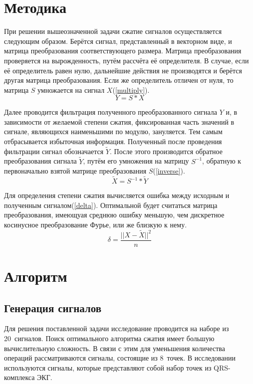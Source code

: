 \documentclass[11pt, oneside, a4paper]{article}
\begin{document}
\section{Методика}

При решении вышеозначенной задачи сжатие сигналов осуществляется следующим образом. Берётся сигнал, представленный в векторном виде, и матрица преобразования соответствующего размера. Матрица преобразования проверяется на вырожденность, путём рассчёта её определителя. В случае, если её определитель равен нулю, дальнейшие действия не производятся и берётся другая матрица преобразования. Если же определитель отличен от нуля, то матрица $S$ умножается на сигнал $X$(\ref{multiply}).
\begin{equation}
\label{multiply}
Y = S * X
\end{equation}

Далее проводится фильтрация полученного преобразованного сигнала $Y$ и, в зависимости от желаемой степени сжатия, фиксированная часть значений в сигнале, являющихся наименьшими по модулю, зануляется. Тем самым отбрасывается избыточная информация. Полученный после проведения фильтрации сигнал обозначается $\tilde{Y}$. После этого производится обратное преобразования сигнала $\tilde{Y}$, путём его умножения на матрицу $S^{-1}$, обратную к первоначально взятой матрице преобразования $S$(\ref{inverse}).
\begin{equation}
\label{inverse}
\tilde{X} = S^{-1} * \tilde{Y}
\end{equation}

Для определения степени сжатия вычисляется ошибка между исходным и полученным сигналом(\ref{delta}). Оптимальной будет считаться матрица преобразования, имеющуая среднюю ошибку меньшую, чем дискретное косинусное преобразование Фурье, или же близкую к нему.
\begin{equation}
\label{delta}
\delta = \frac{||X - \tilde{X}||^2}{n}
\end{equation}

\section{Алгоритм}

\subsection{Генерация сигналов}
Для решения поставленной задачи исследование проводится на наборе из 20~сигналов. Поиск оптимального алгоритма сжатия имеет большую вычислительную сложность. В связи с этим для уменьшения количества операций рассматриваются сигналы, состоящие из 8~точек. В исследовании используются сигналы, которые представляют собой набор точек из QRS-комплекса ЭКГ.
\end{document}
